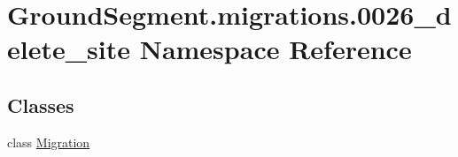 \hypertarget{namespace_ground_segment_1_1migrations_1_10026__delete__site}{}\section{Ground\+Segment.\+migrations.0026\+\_\+delete\+\_\+site Namespace Reference}
\label{namespace_ground_segment_1_1migrations_1_10026__delete__site}
\subsection*{Classes}
\begin{DoxyCompactItemize}
\item 
class \hyperlink{class_ground_segment_1_1migrations_1_10026__delete__site_1_1_migration}{Migration}
\end{DoxyCompactItemize}
